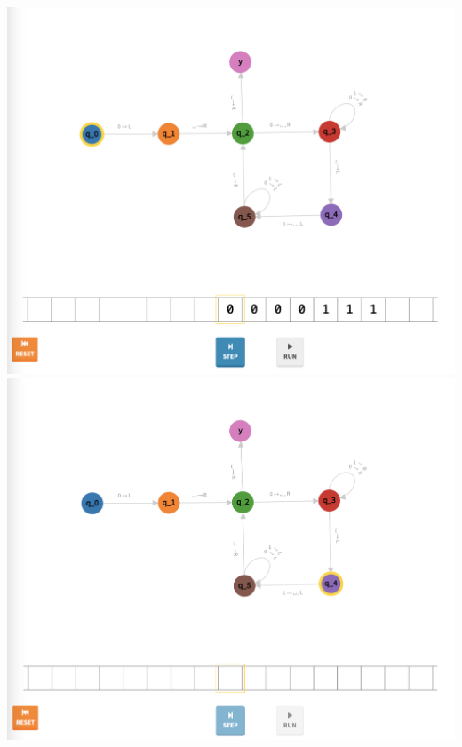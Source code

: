 \documentclass[a4paper]{article}
\begin{document}
\begin{center}
\includegraphics[width=\textwidth]{TM1.5}
\includegraphics[width=\textwidth]{TM1.6}
\end{center}
\newpage
\end{document}
